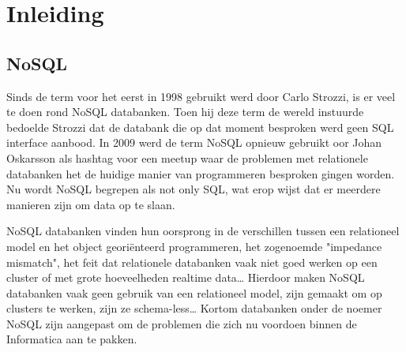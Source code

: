 \chapter{Inleiding}
\label{ch:inleiding}



\section{NoSQL}
Sinds de term voor het eerst in 1998 gebruikt werd door Carlo Strozzi, is er veel te doen rond NoSQL databanken.
Toen hij deze term de wereld instuurde bedoelde Strozzi dat de databank die op dat moment besproken werd geen SQL interface aanbood.
In 2009 werd de term NoSQL opnieuw gebruikt oor Johan Oskarsson als hashtag voor een meetup waar de problemen met relationele databanken het de huidige manier van programmeren besproken gingen worden.
Nu wordt NoSQL begrepen als not only SQL, wat erop wijst dat er meerdere manieren zijn om data op te slaan. \citep{GOTO2013Introduction}

NoSQL databanken vinden hun oorsprong in de verschillen tussen een relationeel model en het object georiënteerd programmeren, het zogenoemde "impedance mismatch", het feit dat relationele databanken vaak niet goed werken op een cluster of met grote hoeveelheden realtime data\dots
Hierdoor maken NoSQL databanken vaak geen gebruik van een relationeel model, zijn gemaakt om op clusters te werken, zijn ze schema-less\dots
Kortom databanken onder de noemer NoSQL zijn aangepast om de problemen die zich nu voordoen binnen de Informatica aan te pakken. \citep{Fowler2012NoSQLDef}

